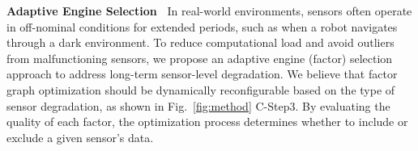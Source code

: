 


\textbf{Adaptive Engine Selection~}
In real-world environments, sensors often operate in off-nominal conditions for extended periods, such as when a robot navigates through a dark environment. To reduce computational load and avoid outliers from malfunctioning sensors, we propose an adaptive engine (factor) selection approach to address long-term sensor-level degradation. We believe that factor graph optimization should be dynamically reconfigurable based on the type of sensor degradation, as shown in Fig.~\ref{fig:method} C-Step3. By evaluating the quality of each factor, the optimization process determines whether to include or exclude a given sensor’s data.

